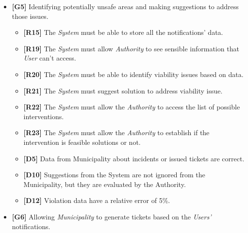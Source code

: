\documentclass {article}
\begin{document}
\begin{itemize}
\begin{itemize}
   			 \item {\bf [R16]} All violation data used for statistics are validated by the {\it Municipality}.
   			 \item {\bf [R17]} The {\it System} imports new data and update map and statistics every 12h.
   			 \item {\bf [R18]} The {\it System} must allow the {\it User} to visualise statistics derived from the data.
   			 \item {\bf [R19]} The {\it System} must allow {\it Authority} to see sensible information that {\it User} can't access. 
   			 \item {\bf [D7]} Permission to access GPS and device data is granted to the System.
   			 \item {\bf [D12]} Violation data have a relative error of 5\%. 
			 \end{itemize}		  
   			 \item {\bf [G5]} Identifying potentially unsafe areas and making suggestions to address those issues.
   		    	\begin{itemize}
   		    	\item {\bf [R15]} The {\it System} must be able to store all the notifications' data.
   		        \item {\bf [R19]} The {\it System} must allow {\it Authority} to see sensible information that {\it User} can't access.
   		    	\item {\bf [R20]} The {\it System} must be able to identify viability issues based on data.
   		    	\item {\bf [R21]} The {\it System} must suggest solution to address viability issue.
   		    	\item {\bf [R22]} The {\it System} must allow the {\it Authority} to access the list of possible interventions. 
   		    	\item {\bf [R23]} The {\it System} must allow the {\it Authority} to establish if the intervention is feasible solutions or not.
   		    	\item {\bf [D5]} Data from Municipality about incidents or issued tickets are correct.
   		    	\item {\bf [D10]} Suggestions from the System are not ignored from the Municipality, but they are evaluated by the Authority.
   		    	\item {\bf [D12]} Violation data have a relative error of 5\%. 
			 \end{itemize}
			  \item {\bf [G6]} Allowing {\it Municipality} to generate tickets based on the {\it Users'} notifications. 

\end{itemize}
\end{document}
